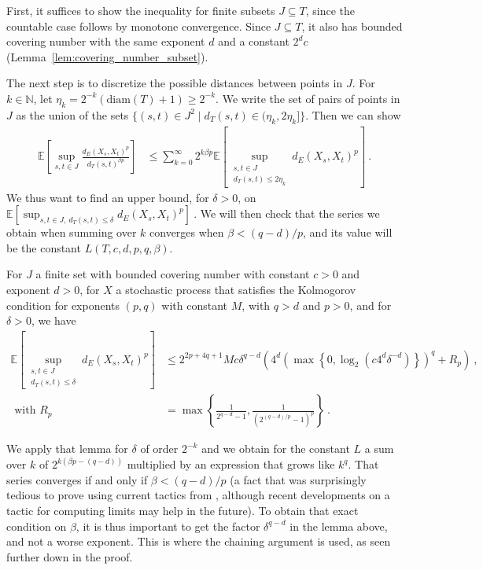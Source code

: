 \documentclass[lean]{Draft}
\makeatletter
\newcommand\leanlink{\begingroup\catcode`\#=12\relax\@leanlink}
\newcommand\@leanlink[2]{\endgroup
\href{#1}
{\texttt{\detokenize{#2}}}}
\newcommand{\docs}[1]{%
\leanlink{https://remydegenne.github.io/brownian-motion/docs/find/?pattern=#1\#doc}
{#1}}
\makeatother
\begin{document}
First, it suffices to show the inequality for finite subsets $J \subseteq T$, since the countable case follows by monotone convergence.
Since $J \subseteq T$, it also has bounded covering number with the same exponent $d$ and a constant $2^d c$ (Lemma~\ref{lem:covering_number_subset}).

The next step is to discretize the possible distances between points in $J$.
For $k \in \mathbb{N}$, let $\eta_k = 2^{-k}(\mathrm{diam}(T) + 1) \ge 2^{-k}$.
We write the set of pairs of points in $J$ as the union of the sets $\{(s, t) \in J^2 \mid d_T(s, t) \in (\eta_k, 2\eta_k]\}$.
Then we can show
\begin{align*}
  \mathbb{E}\left[ \sup_{s, t \in J} \frac{d_E(X_s, X_t)^p}{d_T(s, t)^{\beta p}} \right]
  &\le \sum_{k=0}^\infty 2^{k \beta p} \mathbb{E}\left[ \sup_{\substack{s, t \in J \\ d_T(s, t) \le 2\eta_k}} d_E(X_s, X_t)^p \right]
  \: .
\end{align*}
We thus want to find an upper bound, for $\delta > 0$, on
$
  \mathbb{E}\left[ \sup_{s, t \in J,\: d_T(s, t) \le \delta} d_E(X_s, X_t)^p \right]
  \: .
$
We will then check that the series we obtain when summing over $k$ converges when $\beta < (q - d)/p$, and its value will be the constant $L(T, c, d, p, q, \beta)$.

\begin{lemma}[\docs{ProbabilityTheory.finite_set_bound_of_edist_le}]\label{lem:finite_set_bound_of_dist_le}
For $J$ a finite set with bounded covering number with constant $c > 0$ and exponent $d > 0$, for $X$ a stochastic process that satisfies the Kolmogorov condition for exponents $(p, q)$ with constant $M$, with $q > d$ and $p > 0$, and for $\delta > 0$, we have
\begin{align*}
  \mathbb{E}\left[ \sup_{\substack{s, t \in J \\ d_T(s, t) \le \delta}} d_E(X_s, X_t)^p \right]
  &\le 2^{2p+4q+1} M c \delta^{q-d}\left( 4^d \left(\max\left\{0, \log_2 \left(c 4^d \delta^{-d}\right)\right\}\right)^q + R_p \right)
  \: ,
  \\
  \text{ with } R_p
  &= \max\left\{\frac{1}{2^{q-d} - 1}, \frac{1}{(2^{(q-d)/p} - 1)^p}\right\}
  \: .
\end{align*}
\end{lemma}

We apply that lemma for $\delta$ of order $2^{-k}$ and we obtain for the constant $L$ a sum over $k$ of $2^{k(\beta p - (q - d))}$ multiplied by an expression that grows like $k^q$.
That series converges if and only if $\beta < (q - d)/p$ (a fact that was surprisingly tedious to prove using current tactics from \mathlib, although recent developments on a tactic for computing limits may help in the future).
To obtain that exact condition on $\beta$, it is thus important to get the factor $\delta^{q-d}$ in the lemma above, and not a worse exponent.
This is where the chaining argument is used, as seen further down in the proof.
\end{document}
